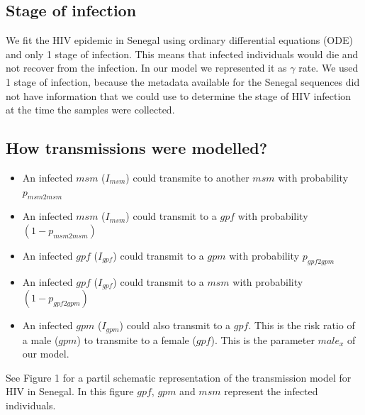 \documentclass[12pt,]{article}
\providecommand{\tightlist}{%
  \setlength{\itemsep}{0pt}\setlength{\parskip}{0pt}}
\begin{document}
\hypertarget{stage-of-infection}{%
\subsection{Stage of infection}\label{stage-of-infection}}

We fit the HIV epidemic in Senegal using ordinary differential equations
(ODE) and only 1 stage of infection. This means that infected
individuals would die and not recover from the infection. In our model
we represented it as \(\gamma\) rate. We used 1 stage of infection,
because the metadata available for the Senegal sequences did not have
information that we could use to determine the stage of HIV infection at
the time the samples were collected.

\hypertarget{how-transmissions-were-modelled}{%
\subsection{How transmissions were
modelled?}\label{how-transmissions-were-modelled}}

\begin{itemize}
\tightlist
\item
  An infected \(msm\) (\(I_{msm}\)) could transmite to another \(msm\)
  with probability \(p_{msm2msm}\)
\item
  An infected \(msm\) (\(I_{msm}\)) could transmit to a \(gpf\) with
  probability \((1 - p_{msm2msm})\)
\item
  An infected \(gpf\) (\(I_{gpf}\)) could transmit to a \(gpm\) with
  probability \(p_{gpf2gpm}\)
\item
  An infected \(gpf\) (\(I_{gpf}\)) could transmit to a \(msm\) with
  probability \((1 - p_{gpf2gpm})\)
\item
  An infected \(gpm\) (\(I_{gpm}\)) could also transmit to a \(gpf\).
  This is the risk ratio of a male (\(gpm\)) to transmite to a female
  (\(gpf\)). This is the parameter \(male_{x}\) of our model.
\end{itemize}

See Figure 1 for a partil schematic representation of the transmission
model for HIV in Senegal. In this figure \(gpf\), \(gpm\) and \(msm\)
represent the infected individuals.
\end{document}
